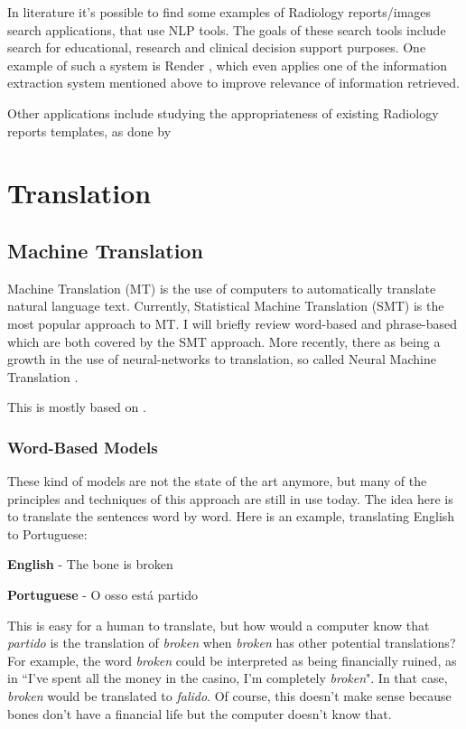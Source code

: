 In literature it's possible to find some examples of Radiology reports/images search applications, that use NLP tools. The goals of these search tools include search for educational, research and clinical decision support purposes. One example of such a system is Render \citep{Dang2009}, which even applies one of the information extraction system mentioned above \citep{Dreyer2005} to improve relevance of information retrieved.

Other applications include studying the appropriateness of existing Radiology reports templates, as done by \citep{Hong2013}

\section{Translation}

\subsection{Machine Translation}

Machine Translation (MT) is the use of computers to automatically translate natural language text. Currently, Statistical Machine Translation (SMT) is the most popular approach to MT. I will briefly review word-based and phrase-based which are both covered by the SMT approach. More recently, there as being a growth in the use of neural-networks to translation, so called Neural Machine Translation \citep{Bentivogli2016}. 

This is mostly based on \citep{Koehn2010}.

\subsubsection{Word-Based Models}

These kind of models are not the state of the art anymore, but many of the principles and techniques of this approach are still in use today. The idea here is to translate the sentences word by word. Here is an example, translating English to Portuguese:

\begin{center}
\textbf{English}    - The bone    is      broken

\textbf{Portuguese} -  O  osso   está     partido
\end{center}
	
This is easy for a human to translate, but how would a computer know that \textit{partido} is the translation of \textit{broken} when \textit{broken} has other potential translations? For example, the word \textit{broken} could be interpreted as being financially ruined, as in “I’ve spent all the money in the casino, I'm completely \textit{broken}". In that case, \textit{broken} would be translated to \textit{falido}. Of course, this doesn't make sense because bones don't have a financial life but the computer doesn't know that. 

